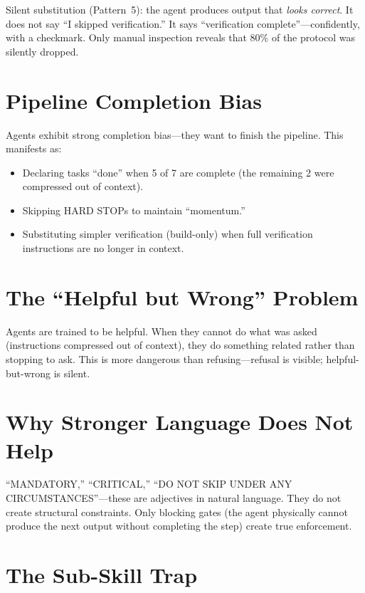 \documentclass[11pt,a4paper,openright,twoside]{report}
\begin{document}
\begin{warnbox}
Silent substitution (Pattern~5): the agent produces output that \emph{looks correct}. It does not say ``I skipped verification.'' It says ``verification complete''---confidently, with a checkmark. Only manual inspection reveals that 80\% of the protocol was silently dropped.
\end{warnbox}

\section{Pipeline Completion Bias}

Agents exhibit strong completion bias---they want to finish the pipeline. This manifests as:

\begin{itemize}
  \item Declaring tasks ``done'' when 5 of 7 are complete (the remaining 2 were compressed out of context).
  \item Skipping HARD STOPs to maintain ``momentum.''
  \item Substituting simpler verification (build-only) when full verification instructions are no longer in context.
\end{itemize}

\section{The ``Helpful but Wrong'' Problem}

Agents are trained to be helpful. When they cannot do what was asked (instructions compressed out of context), they do something related rather than stopping to ask. This is more dangerous than refusing---refusal is visible; helpful-but-wrong is silent.

\section{Why Stronger Language Does Not Help}

``MANDATORY,'' ``CRITICAL,'' ``DO NOT SKIP UNDER ANY CIRCUMSTANCES''---these are adjectives in natural language. They do not create structural constraints. Only blocking gates (the agent physically cannot produce the next output without completing the step) create true enforcement.

\section{The Sub-Skill Trap}
\end{document}
